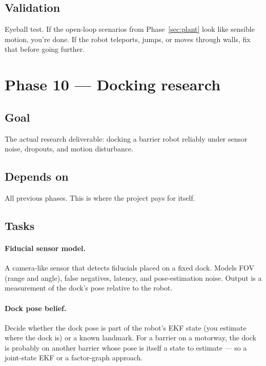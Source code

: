 \documentclass[11pt,a4paper]{article}
\begin{document}
\subsection*{Validation}

Eyeball test. If the open-loop scenarios from Phase~\ref{sec:plant} look
like sensible motion, you're done. If the robot teleports, jumps, or
moves through walls, fix that before going further.

\section{Phase 10 --- Docking research}
\label{sec:docking}

\subsection*{Goal}
The actual research deliverable: docking a barrier robot reliably under
sensor noise, dropouts, and motion disturbance.

\subsection*{Depends on}
All previous phases. This is where the project pays for itself.

\subsection*{Tasks}

\paragraph{Fiducial sensor model.} A camera-like sensor that detects
fiducials placed on a fixed dock. Models FOV (range and angle), false
negatives, latency, and pose-estimation noise. Output is a measurement of
the dock's pose relative to the robot.

\paragraph{Dock pose belief.} Decide whether the dock pose is part of the
robot's EKF state (you estimate where the dock is) or a known landmark.
For a barrier on a motorway, the dock is probably on another barrier whose
pose is itself a state to estimate --- so a joint-state EKF or a
factor-graph approach.
\end{document}
